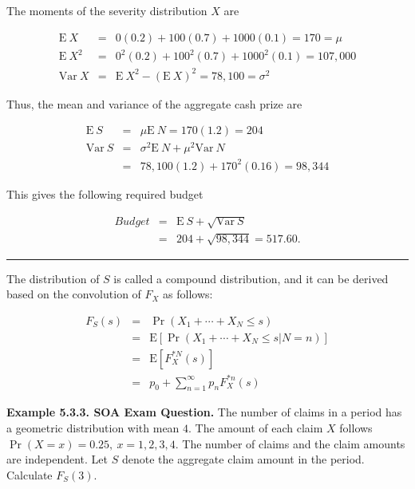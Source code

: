 \documentclass[]{book}
\theoremstyle{definition}
\theoremstyle{definition}
\theoremstyle{definition}
\theoremstyle{remark}
\begin{document}
The moments of the severity distribution \(X\) are

\begin{eqnarray*}
\mathrm{E~}X &=& 0 (0.2) + 100 (0.7) + 1000 (0.1) = 170 = \mu\\
\mathrm{E~}X^2 &=& 0^2 (0.2) + 100^2 (0.7) + 1000^2 (0.1) = 107,000\\
\mathrm{Var~}X &=& \mathrm{E~}X^2 - \left( \mathrm{E~}X \right)^2=78,100 = \sigma^2
\end{eqnarray*}

Thus, the mean and variance of the aggregate cash prize are

\begin{eqnarray*}
\mathrm{E~}S  &=& \mu \mathrm{E~}N = 170 (1.2) = 204 \\
\mathrm{Var~}S &=& \sigma^2 \mathrm{E~}N + \mu^2 \mathrm{Var~}N\\
&=& 78,100 (1.2) + 170^2 (0.16) = 98,344
\end{eqnarray*}

This gives the following required budget

\begin{eqnarray*}
Budget &=& \mathrm{E~}S + \sqrt{\mathrm{Var~}S} \\
&=& 204 + \sqrt{98,344} = 517.60 .
\end{eqnarray*}

\begin{center}\rule{0.5\linewidth}{\linethickness}\end{center}

The distribution of \(S\) is called a compound distribution, and it can
be derived based on the convolution of \(F_X\) as follows:

\begin{eqnarray*}
F_{S}(s) &=& \Pr \left(X_1 + \cdots + X_N \le s \right) \\
&=&  \mathrm{E} \left[ \Pr \left(X_1 + \cdots + X_N  \le s|N=n \right) \right]\\
&=&  \mathrm{E} \left[ F_{X}^{\ast N}(s) \right] \\
&=&  p_0 + \sum_{n=1}^{\infty }p_n F_{X}^{\ast n}(s)
\end{eqnarray*}

\textbf{Example 5.3.3. SOA Exam Question.} The number of claims in a
period has a geometric distribution with mean \(4\). The amount of each
claim \(X\) follows \(\Pr(X=x) = 0.25, \ x=1,2,3,4.\) The number of
claims and the claim amounts are independent. Let \(S\) denote the
aggregate claim amount in the period. Calculate \(F_{S}(3)\).
\end{document}
